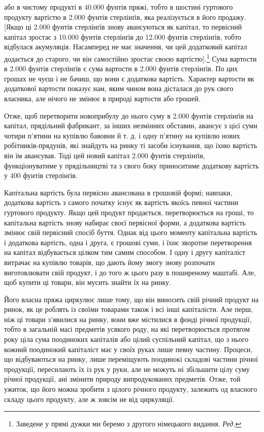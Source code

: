 \parcont{}  %
або в чистому продукті в 40.000 фунтів пряжі, тобто в шостині
гуртового продукту вартістю в 2.000 фунтів стерлінґів, яка
реалізується в його продажу. [Якщо ці 2.000 фунтів стерлінґів
знову авансуються як капітал, то первісний капітал зростає
з 10.000 фунтів стерлінґів до 12.000 фунтів стерлінґів, тобто
відбулася акумуляція. Насамперед не має значення, чи цей додатковий
капітал додається до старого, чи він самостійно зростає
своєю вартістю].\footnote*{
Заведене у прямі дужки ми беремо з другого німецького видання.
\emph{Ред.}
} Сума вартости в 2.000 фунтів стерлінґів є сума
вартости в 2.000 фунтів стерлінґів. По цих грошах не чуєш і не
бачиш, що вони є додаткова вартість. Характер вартости як додаткової
вартости показує нам, яким чином вона дісталася до
рук свого власника, але нічого не змінює в природі вартости
або грошей.

Отже, щоб перетворити новоприбулу до нього суму в 2.000 фунтів
стерлінґів на капітал, прядільний фабрикант, за інших незмінних
обставин, авансує з цієї суми чотири п’ятини на купівлю
бавовни й т. д. і одну п’ятину на купівлю нових робітників-прядунів,
які знайдуть на ринку ті засоби існування, що їхню вартість
він їм авансував. Тоді цей новий капітал 2.000 фунтів
стерлінґів, функціонуватиме у прядільництві та з свого боку
приноситиме додаткову вартість у 400 фунтів стерлінґів.

Капітальна вартість була первісно авансована в грошовій
формі; навпаки, додаткова вартість з самого початку існує як
вартість якоїсь певної частини гуртового продукту. Якщо цей
продукт продається, перетворюється на гроші, то капітальна
вартість знову набирає своєї первісної форми, а додаткова вартість
змінює свій первісний спосіб буття. Однак від цього моменту
капітальна вартість і додаткова вартість, одна і друга, є грошові
суми, і їхнє зворотне перетворення на капітал відбувається цілком
тим самим способом. І одну і другу капіталіст витрачає на
купівлю товарів, що дають йому змогу знову розпочати виготовлювати
свій продукт, і до того ж цього разу в поширеному
маштабі. Але, щоб купити ці товари, він мусить знайти їх на ринку.

Його власна пряжа циркулює лише тому, що він виносить
свій річний продукт на ринок, як це роблять із своїми товарами
також і всі інші капіталісти. Але перш, ніж ці товари з’явилися
на ринку, вони вже містилися в фонді річної продукції, тобто в
загальній масі предметів усякого роду, на які перетворюється
протягом року ціла сума поодиноких капіталів або цілий суспільний
капітал, що з нього кожний поодинокий капіталіст має
у своїх руках лише певну частину. Процеси, що відбуваються на
ринку, лише переміщують поодинокі складові частини річної
продукції, пересилають їх із рук у руки, але не можуть ні збільшити
цілу суму річної продукції, ані змінити природу випродукованих
предметів. Отже, той ужиток, що його можна зробити
з цілого річного продукту, залежить од власного складу цього
продукту, але ж зовсім не від циркуляції.
